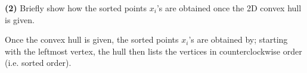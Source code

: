 \documentclass[11pt]{article}
\begin{document}
\vspace{5pt}
\noindent
\textbf{(2)} Briefly show how the sorted points $x_{i}$’s are obtained once the 2D convex hull
is given.
\newline

\vspace{5pt}
\noindent
Once the convex hull is given, the sorted points $x_{i}$'s are obtained by; starting with the leftmost vertex, the hull then lists the vertices in counterclockwise order (i.e. sorted order).
\end{document}
